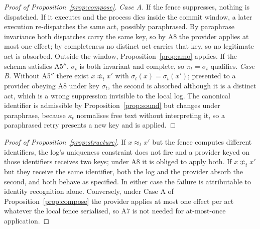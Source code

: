 \begin{proof}[Proof of Proposition~\ref{prop:compose}]
\emph{Case A.} If the fence suppresses, nothing is dispatched. If it executes and the process dies inside the commit window, a later execution re-dispatches the same act, possibly paraphrased. By paraphrase invariance both dispatches carry the same key, so by A8 the provider applies at most one effect; by completeness no distinct act carries that key, so no legitimate act is absorbed. Outside the window, Proposition~\ref{prop:amo} applies. If the schema satisfies A5$''$, $\sigma_t$ is both invariant and complete, so $\pi_t=\sigma_t$ qualifies.
\emph{Case B.} Without A5$''$ there exist $x\not\approx_t x'$ with $\sigma_t(x)=\sigma_t(x')$; presented to a provider obeying A8 under key $\sigma_t$, the second is absorbed although it is a distinct act, which is a wrong suppression invisible to the local log. The canonical identifier is admissible by Proposition~\ref{prop:sound} but changes under paraphrase, because $\kappa_t$ normalises free text without interpreting it, so a paraphrased retry presents a new key and is applied.
\end{proof}

\begin{proof}[Proof of Proposition~\ref{prop:structure}]
If $x\approx_t x'$ but the fence computes different identifiers, the log's uniqueness constraint does not fire and a provider keyed on those identifiers receives two keys; under A8 it is obliged to apply both. If $x\not\approx_t x'$ but they receive the same identifier, both the log and the provider absorb the second, and both behave as specified. In either case the failure is attributable to identity recognition alone. Conversely, under Case A of Proposition~\ref{prop:compose} the provider applies at most one effect per act whatever the local fence serialised, so A7 is not needed for at-most-once application.
\end{proof}
